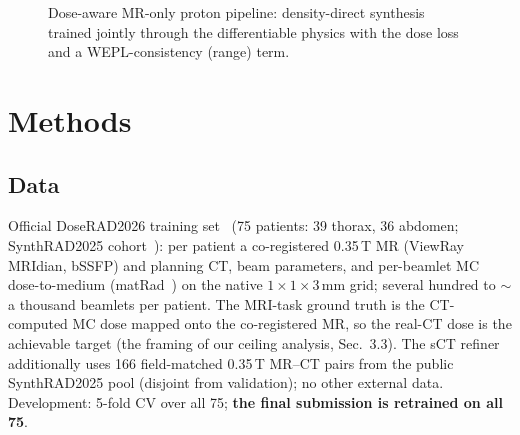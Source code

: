 \documentclass{llncs}
\newcommand{\opS}{\mathcal{S}}\newcommand{\opD}{\mathcal{D}}\newcommand{\opX}{\mathcal{X}}
\newcommand{\opR}{\mathcal{R}}\newcommand{\opC}{\mathcal{C}}\newcommand{\gam}{\gamma}
\begin{document}
\begin{figure}[t]\centering
{}
\caption{Dose-aware MR-only proton pipeline: density-direct synthesis trained jointly through
the differentiable physics with the dose loss and a WEPL-consistency (range)
term.}\label{fig:framework}
\end{figure}

\section{Methods}
\subsection{Data}
Official DoseRAD2026 training set~\cite{challenge} (75 patients: 39 thorax, 36 abdomen;
SynthRAD2025 cohort~\cite{synthrad}): per patient a co-registered 0.35\,T MR (ViewRay MRIdian,
bSSFP) and planning CT, beam parameters, and per-beamlet MC dose-to-medium
(matRad~\cite{matrad}) on the native $1{\times}1{\times}3$\,mm grid; several hundred to
$\sim$a thousand beamlets per patient. The MRI-task ground truth is the CT-computed MC dose
mapped onto the co-registered MR, so the real-CT dose is the achievable target (the framing of
our ceiling analysis, Sec.~3.3). The sCT refiner additionally uses 166 field-matched 0.35\,T
MR--CT pairs from the public SynthRAD2025 pool (disjoint from validation); no other external
data. Development: 5-fold CV over all 75; \textbf{the final submission is retrained on all 75}.
\end{document}
